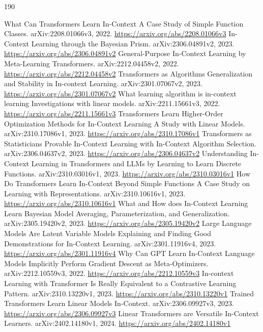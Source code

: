 \documentclass[11pt]{article}
\begin{document}
\begin{thebibliography}{190}
 What Can Transformers Learn In-Context A Case Study of Simple Function Classes. arXiv:2208.01066v3, 2022. \url{https://arxiv.org/abs/2208.01066v3}
 In-Context Learning through the Bayesian Prism. arXiv:2306.04891v2, 2023. \url{https://arxiv.org/abs/2306.04891v2}
 General-Purpose In-Context Learning by Meta-Learning Transformers. arXiv:2212.04458v2, 2022. \url{https://arxiv.org/abs/2212.04458v2}
 Transformers as Algorithms Generalization and Stability in In-context Learning. arXiv:2301.07067v2, 2023. \url{https://arxiv.org/abs/2301.07067v2}
 What learning algorithm is in-context learning Investigations with linear models. arXiv:2211.15661v3, 2022. \url{https://arxiv.org/abs/2211.15661v3}
 Transformers Learn Higher-Order Optimization Methods for In-Context Learning A Study with Linear Models. arXiv:2310.17086v1, 2023. \url{https://arxiv.org/abs/2310.17086v1}
 Transformers as Statisticians Provable In-Context Learning with In-Context Algorithm Selection. arXiv:2306.04637v2, 2023. \url{https://arxiv.org/abs/2306.04637v2}
 Understanding In-Context Learning in Transformers and LLMs by Learning to Learn Discrete Functions. arXiv:2310.03016v1, 2023. \url{https://arxiv.org/abs/2310.03016v1}
 How Do Transformers Learn In-Context Beyond Simple Functions A Case Study on Learning with Representations. arXiv:2310.10616v1, 2023. \url{https://arxiv.org/abs/2310.10616v1}
 What and How does In-Context Learning Learn Bayesian Model Averaging, Parameterization, and Generalization. arXiv:2305.19420v2, 2023. \url{https://arxiv.org/abs/2305.19420v2}
 Large Language Models Are Latent Variable Models Explaining and Finding Good Demonstrations for In-Context Learning. arXiv:2301.11916v4, 2023. \url{https://arxiv.org/abs/2301.11916v4}
 Why Can GPT Learn In-Context Language Models Implicitly Perform Gradient Descent as Meta-Optimizers. arXiv:2212.10559v3, 2022. \url{https://arxiv.org/abs/2212.10559v3}
 In-context Learning with Transformer Is Really Equivalent to a Contrastive Learning Pattern. arXiv:2310.13220v1, 2023. \url{https://arxiv.org/abs/2310.13220v1}
 Trained Transformers Learn Linear Models In-Context. arXiv:2306.09927v3, 2023. \url{https://arxiv.org/abs/2306.09927v3}
 Linear Transformers are Versatile In-Context Learners. arXiv:2402.14180v1, 2024. \url{https://arxiv.org/abs/2402.14180v1}

\end{thebibliography}
\end{document}
